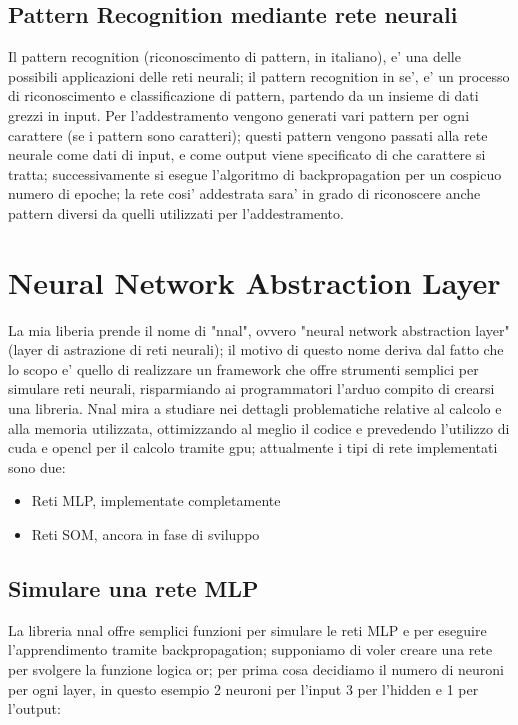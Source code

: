 \documentclass[a4paper,10pt]{report}
\begin{document}
\section{Pattern Recognition mediante rete neurali}
Il pattern recognition (riconoscimento di pattern, in italiano), 
e' una delle possibili applicazioni delle reti neurali; 
il pattern recognition in se', e' un processo di 
riconoscimento e classificazione di pattern, partendo
da un insieme di dati grezzi in input. Per l'addestramento vengono
generati vari pattern per ogni carattere (se i pattern sono caratteri); 
questi pattern vengono
passati alla rete neurale come dati di input, e come output viene 
specificato di che carattere si tratta; successivamente si esegue 
l'algoritmo di backpropagation per un cospicuo numero di epoche;
la rete cosi' addestrata sara' in grado di riconoscere anche pattern diversi
da quelli utilizzati per l'addestramento.




\chapter{Neural Network Abstraction Layer}
La mia liberia prende il nome di "nnal", ovvero "neural network abstraction layer" 
(layer
di astrazione di reti neurali); il motivo di questo nome deriva dal fatto che lo scopo 
e' quello
di realizzare un framework che offre strumenti semplici per simulare reti neurali, 
risparmiando ai
programmatori l'arduo compito di crearsi una libreria. Nnal mira a studiare nei 
dettagli
problematiche relative al calcolo e alla memoria utilizzata, ottimizzando al meglio 
il codice e prevedendo
l'utilizzo di cuda e opencl per il calcolo tramite gpu;
attualmente i tipi di rete implementati sono due:
\begin{itemize}
\item Reti MLP, implementate completamente
\item Reti SOM, ancora in fase di sviluppo
\end{itemize}

\section{Simulare una rete MLP}
La libreria nnal offre semplici funzioni per simulare le reti MLP e 
per eseguire l'apprendimento tramite backpropagation; supponiamo di voler
creare una rete per svolgere la funzione logica or;
per prima cosa decidiamo il numero di neuroni per ogni layer, in
questo esempio 2 neuroni per l'input
3 per l'hidden e 1 per l'output:
\end{document}
